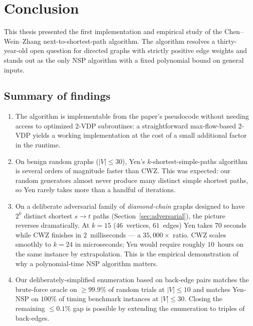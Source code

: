 \chapter{Conclusion}
\label{ch:conclusion}

This thesis presented the first implementation and empirical study of the
Chen--Wein--Zhang next-to-shortest-path algorithm. The algorithm resolves
a thirty-year-old open question for directed graphs with strictly positive
edge weights and stands out as the only NSP algorithm with a fixed
polynomial bound on general inputs.

\section{Summary of findings}

\begin{enumerate}
  \item The algorithm is implementable from the paper's pseudocode without
    needing access to optimized 2-VDP subroutines: a straightforward
    max-flow-based 2-VDP yields a working implementation at the cost of
    a small additional factor in the runtime.
  \item On benign random graphs ($|V|\le 30$), Yen's
    $k$-shortest-simple-paths algorithm is several orders of magnitude
    faster than CWZ. This was expected: our random generators almost never
    produce many distinct simple shortest paths, so Yen rarely takes more
    than a handful of iterations.
  \item On a deliberate adversarial family of \emph{diamond-chain} graphs
    designed to have $2^{k}$ distinct shortest $s\to t$ paths
    (Section~\ref{sec:adversarial}), the picture reverses dramatically.
    At $k=15$ ($46$~vertices, $61$~edges) Yen takes $70$ seconds while CWZ
    finishes in $2$~milliseconds --- a $35{,}000\times$ ratio. CWZ scales
    smoothly to $k=24$ in microseconds; Yen would require roughly
    $10$~hours on the same instance by extrapolation. This is the
    empirical demonstration of why a polynomial-time NSP algorithm
    matters.
  \item Our deliberately-simplified enumeration based on back-edge pairs
    matches the brute-force oracle on $\ge 99.9\%$ of random trials at
    $|V|\le 10$ and matches Yen-NSP on $100\%$ of timing benchmark
    instances at $|V|\le 30$. Closing the remaining $\le 0.1\%$ gap is
    possible by extending the enumeration to triples of back-edges.
\end{enumerate}

